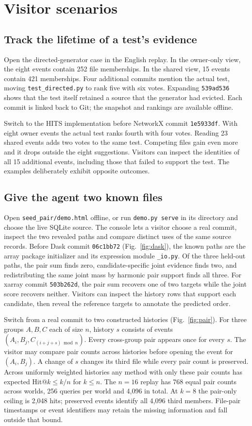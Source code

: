 \documentclass[conference]{IEEEtran}
\begin{document}
\section{Visitor scenarios}
\subsection{Track the lifetime of a test's evidence}
Open the directed-generator case in the English replay. In the owner-only view, the eight events contain 252 file memberships. In the shared view, 15 events contain 421 memberships. Four additional commits mention the actual test, moving \texttt{test\_directed.py} to rank five with six votes. Expanding \texttt{539ad536} shows that the test itself retained a source that the generator had evicted. Each commit is linked back to Git; the snapshot and rankings are available offline.

Switch to the HITS implementation before NetworkX commit \texttt{1e5933df}. With eight owner events the actual test ranks fourth with four votes. Reading 23 shared events adds two votes to the same test. Competing files gain even more and it drops outside the eight suggestions. Visitors can inspect the identities of all 15 additional events, including those that failed to support the test. The examples deliberately exhibit opposite outcomes.

\subsection{Give the agent two known files}
Open \texttt{seed\_pair/demo.html} offline, or run \texttt{demo.py serve} in its directory and choose the live SQLite source. The console lets a visitor choose a real commit, inspect the two revealed paths and compare distinct uses of the same source records. Before Dask commit \texttt{06c1bb72} (Fig.~\ref{fig:dask}), the known paths are the array package initializer and its expression module \texttt{\_io.py}. Of the three held-out paths, the pair sum finds zero, candidate-specific joint evidence finds two, and redistributing the same joint mass by harmonic pair support finds all three. For xarray commit \texttt{503b262d}, the pair sum recovers one of two targets while the joint score recovers neither. Visitors can inspect the history rows that support each candidate, then reveal the reference targets to annotate the predicted order.

Switch from a real commit to two constructed histories (Fig.~\ref{fig:pair}). For three groups $A,B,C$ each of size $n$, history $s$ consists of events $(A_i,B_j,C_{(i+j+s)\bmod n})$. Every cross-group pair appears once for every $s$. The visitor may compare pair counts across histories before opening the event for $(A_i,B_j)$. A change of $s$ changes its third file while every pair count is preserved. Across uniformly weighted histories any method with only these pair counts has expected Hit@$k\le k/n$ for $k\le n$. The $n=16$ replay has 768 equal pair counts across worlds, 256 queries per world and 4,096 in total. At $k=8$ the pair-only ceiling is 2,048 hits; preserved events identify all 4,096 third members. File-pair timestamps or event identifiers may retain the missing information and fall outside that bound.
\end{document}
